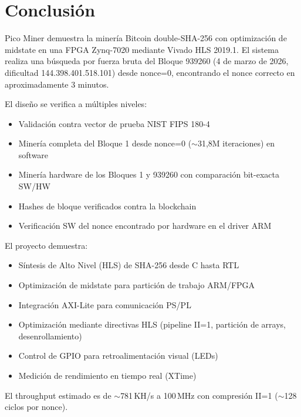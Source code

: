 \documentclass[12pt,a4paper]{article}
\begin{document}
\section{Conclusi\'on}

Pico Miner demuestra la miner\'ia Bitcoin double-SHA-256 con optimizaci\'on de midstate
en una FPGA Zynq-7020 mediante Vivado HLS 2019.1. El sistema realiza una b\'usqueda
por fuerza bruta del Bloque 939260 (4 de marzo de 2026, dificultad
144.398.401.518.101) desde nonce=0, encontrando el nonce correcto en
aproximadamente 3 minutos.

El dise\~no se verifica a m\'ultiples niveles:
\begin{itemize}[leftmargin=2em]
    \item Validaci\'on contra vector de prueba NIST FIPS 180-4
    \item Miner\'ia completa del Bloque 1 desde nonce=0 ($\sim$31,8M iteraciones) en software
    \item Miner\'ia hardware de los Bloques 1 y 939260 con comparaci\'on bit-exacta SW/HW
    \item Hashes de bloque verificados contra la blockchain
    \item Verificaci\'on SW del nonce encontrado por hardware en el driver ARM
\end{itemize}

El proyecto demuestra:
\begin{itemize}[leftmargin=2em]
    \item S\'intesis de Alto Nivel (HLS) de SHA-256 desde C hasta RTL
    \item Optimizaci\'on de midstate para partici\'on de trabajo ARM/FPGA
    \item Integraci\'on AXI-Lite para comunicaci\'on PS/PL
    \item Optimizaci\'on mediante directivas HLS (pipeline II=1, partici\'on de arrays, desenrollamiento)
    \item Control de GPIO para retroalimentaci\'on visual (LEDs)
    \item Medici\'on de rendimiento en tiempo real (XTime)
\end{itemize}

El throughput estimado es de $\sim$781\,KH/s a 100\,MHz con compresi\'on II=1
($\sim$128 ciclos por nonce).

\end{document}
